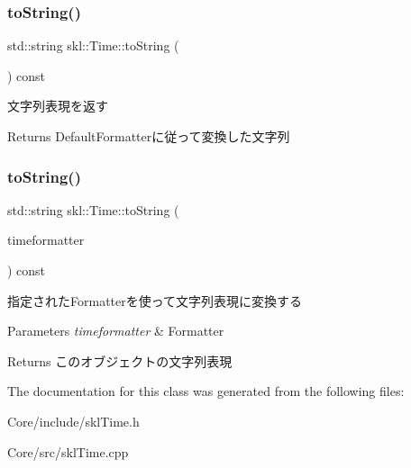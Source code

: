 \subsubsection{\texorpdfstring{to\+String()}{toString()}\hspace{0.1cm}{\footnotesize\ttfamily [1/2]}}
{\footnotesize\ttfamily std\+::string skl\+::\+Time\+::to\+String (\begin{DoxyParamCaption}{ }\end{DoxyParamCaption}) const}



文字列表現を返す 

\begin{DoxyReturn}{Returns}
Default\+Formatterに従って変換した文字列 
\end{DoxyReturn}
\hypertarget{classskl_1_1_time_a44aed89659091d18d67e4503c47f0748}{}\label{classskl_1_1_time_a44aed89659091d18d67e4503c47f0748} 
\subsubsection{\texorpdfstring{to\+String()}{toString()}\hspace{0.1cm}{\footnotesize\ttfamily [2/2]}}
{\footnotesize\ttfamily std\+::string skl\+::\+Time\+::to\+String (\begin{DoxyParamCaption}\item[{\hyperlink{classskl_1_1_time_formatter}{Time\+Formatter} $\ast$}]{timeformatter }\end{DoxyParamCaption}) const}



指定された\+Formatterを使って文字列表現に変換する 


\begin{DoxyParams}{Parameters}
{\em timeformatter} & Formatter\\
\hline
\end{DoxyParams}
\begin{DoxyReturn}{Returns}
このオブジェクトの文字列表現 
\end{DoxyReturn}


The documentation for this class was generated from the following files\+:\begin{DoxyCompactItemize}
\item 
Core/include/skl\+Time.\+h\item 
Core/src/skl\+Time.\+cpp\end{DoxyCompactItemize}
